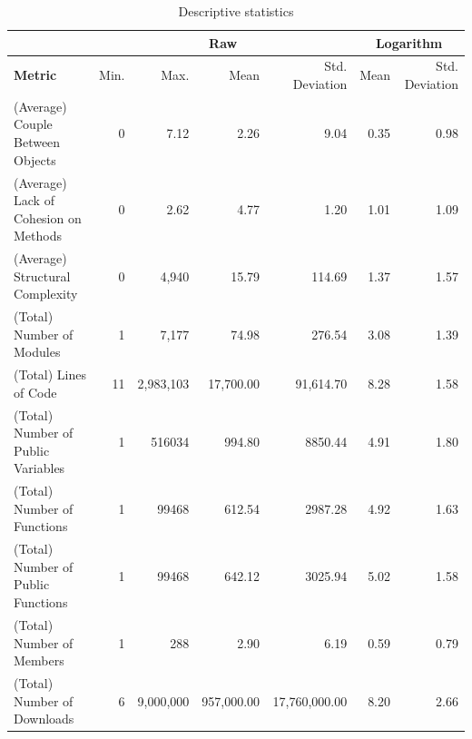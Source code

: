 \documentclass[conference]{IEEEtran}
\begin{document}
\begin{center}
\begin{table}[hbt]
\centering \caption{Descriptive statistics}
\begin{tabular}{|l|r|r|r|r|r|r|} \hline
  & \multicolumn{4}{|c|}{Raw} & \multicolumn{2}{|c|}{Logarithm}\\ \hline

\textbf{Metric} 	    & Min. & Max.        & Mean      & Std. Deviation & Mean & Std. Deviation \\ \hline

(Average) Couple Between Objects      & 0    & 7.12        & 2.26      & 9.04           & 0.35 & 0.98 \\ \hline

(Average) Lack of Cohesion on Methods & 0    & 2.62        & 4.77      & 1.20           & 1.01 & 1.09 \\ \hline

(Average) Structural Complexity       & 0    & 4,940       & 15.79     & 114.69         & 1.37 & 1.57 \\ \hline

(Total) Number of Modules           & 1    & 7,177       & 74.98     & 276.54         & 3.08 & 1.39 \\ \hline

(Total) Lines of Code               & 11   & 2,983,103   & 17,700.00 & 91,614.70      & 8.28 & 1.58 \\ \hline

(Total) Number of Public Variables  & 1    & 516034      & 994.80    & 8850.44        & 4.91 & 1.80 \\ \hline

(Total) Number of Functions	    & 1    & 99468       & 612.54    & 2987.28        & 4.92 & 1.63 \\ \hline

(Total) Number of Public Functions  & 1    & 99468       & 642.12    & 3025.94        & 5.02 & 1.58 \\ \hline

(Total) Number of Members           & 1    & 288         & 2.90       & 6.19          & 0.59 & 0.79 \\ \hline

(Total) Number of Downloads         & 6    & 9,000,000   & 957,000.00 & 17,760,000.00 & 8.20 & 2.66 \\ \hline

\end{tabular}
\label{table:statistics}
\end{table}
\end{center}
\end{document}
